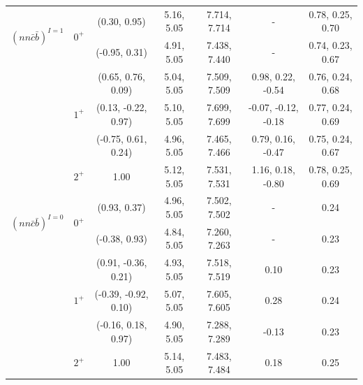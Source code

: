 \documentclass[prd,twocolumn,floatfix,nofootinbib]{revtex4}
\begin{document}
\begin{table}[!htbp]
\begin{tabular}{ccccccc}
        \multirow{2}{*}{${(nn\bar{c}\bar{b})}^{I=1}$}
                        &\multirow{2}{*}{$0^{+}$}
                                    &(0.30, 0.95)           &5.16, 5.05	    &7.714, 7.714	    &-                      &0.78, 0.25, 0.70 \\
                        &           &(-0.95, 0.31)          &4.91, 5.05	    &7.438, 7.440	    &-                      &0.74, 0.23, 0.67 \\
                        &\multirow{3}{*}{$1^{+}$}
                                    &(0.65, 0.76, 0.09)     &5.04, 5.05	    &7.509, 7.509	    &0.98, 0.22, -0.54      &0.76, 0.24, 0.68 \\
                        &           &(0.13, -0.22, 0.97)    &5.10, 5.05	    &7.699, 7.699	    &-0.07, -0.12, -0.18    &0.77, 0.24, 0.69 \\
                        &           &(-0.75, 0.61, 0.24)    &4.96, 5.05	    &7.465, 7.466	    &0.79, 0.16, -0.47      &0.75, 0.24, 0.67 \\
                        &$2^{+}$    &1.00                   &5.12, 5.05	    &7.531, 7.531	    &1.16, 0.18, -0.80      &0.78, 0.25, 0.69 \\
        \multirow{2}{*}{${(nn\bar{c}\bar{b})}^{I=0}$}
                        &\multirow{2}{*}{$0^{+}$}
                                    &(0.93, 0.37)           &4.96, 5.05	    &7.502, 7.502	    &-                      &0.24 \\
                        &           &(-0.38, 0.93)          &4.84, 5.05	    &7.260, 7.263	    &-                      &0.23 \\
                        &\multirow{3}{*}{$1^{+}$}
                                    &(0.91, -0.36, 0.21)    &4.93, 5.05	    &7.518, 7.519	    &0.10                   &0.23 \\
                        &           &(-0.39, -0.92, 0.10)   &5.07, 5.05	    &7.605, 7.605	    &0.28                   &0.24 \\
                        &           &(-0.16, 0.18, 0.97)    &4.90, 5.05	    &7.288, 7.289	    &-0.13                  &0.23 \\
                        &$2^{+}$    &1.00                   &5.14, 5.05	    &7.483, 7.484	    &0.18                   &0.25 \\
        \hline\hline
    \end{tabular}
\end{table}
\end{document}
